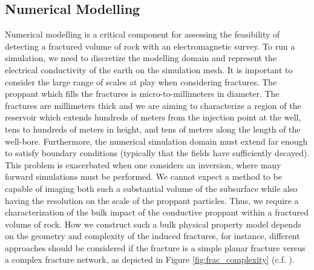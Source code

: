 \subsection{Numerical Modelling}
Numerical modelling is a critical component for assessing the feasibility of detecting a fractured volume of rock with an electromagnetic survey. To run a simulation, we need to discretize the modelling domain and represent the electrical conductivity of the earth on the simulation mesh. It is important to consider the large range of scales at play when considering fractures. The proppant which fills the fractures is micro-to-millimeters in diameter. The fractures are millimeters thick and we are aiming to characterize a region of the reservoir which extends hundreds of meters from the injection point at the well, tens to hundreds of meters in height, and tens of meters along the length of the well-bore. Furthermore, the numerical simulation domain must extend far enough to satisfy boundary conditions (typically that the fields have sufficiently decayed). This problem is exacerbated when one considers an inversion, where many forward simulations must be performed. We cannot expect a method to be capable of imaging both such a substantial volume of the subsurface while also having the resolution on the scale of the proppant particles. Thus, we require a characterization of the bulk impact of the conductive proppant within a fractured volume of rock. How we construct such a bulk physical property model depends on the geometry and complexity of the induced fractures, for instance, different approaches should be considered if the fracture is a simple planar fracture versus a complex fracture network, as depicted in Figure \ref{fig:frac_complexity} (c.f. \cite{Cipolla2008}).




